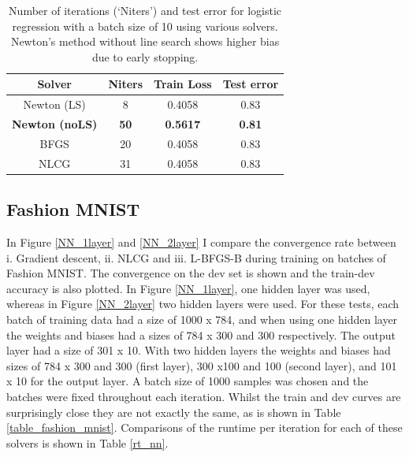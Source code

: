 \documentclass[11pt,twocolumn]{article}
\begin{document}
\begin{table}[h!]
\begin{center}
\begin{tabular}{ cccc} %
\hline
Solver & Niters & Train Loss & Test error  \\ 
\hline 
\hline
Newton (LS) & 8 & 0.4058 & 0.83\\ 
\textbf{Newton (noLS)} & \textbf{50} & \textbf{0.5617} & \textbf{0.81}\\ 
BFGS & 20 & 0.4058 & 0.83\\ 
NLCG & 31 & 0.4058 & 0.83\\ 
\end{tabular}
\end{center}
\caption{Number of iterations (`Niters')  and test error for logistic regression with a batch size of 10 using various solvers. Newton's method without line search shows higher bias due to early stopping.}\label{table_sfixlogreg_testerror}
\end{table}

\subsection{Fashion MNIST} \label{results_NN}
In Figure \ref{NN_1layer} and \ref{NN_2layer} I compare the convergence rate between i. Gradient descent,  ii. NLCG and  iii. L-BFGS-B during training on batches of Fashion MNIST. The convergence on the dev set is shown and the train-dev accuracy is also plotted. In Figure \ref{NN_1layer}, one hidden layer was used, whereas in Figure \ref{NN_2layer} two hidden layers were used. For these tests, each batch of training data had a size of 1000 x 784, and when using one hidden layer the weights and biases had a sizes of 784 x 300 and 300 respectively. The output layer had a size of 301 x 10. With two hidden layers the weights and biases had sizes of 784 x 300 and 300 (first layer), 300 x100 and 100 (second layer), and 101 x 10 for the output layer. A batch size of 1000 samples was chosen and the batches were fixed throughout each iteration. Whilst the train and dev curves are surprisingly close they are not exactly the same, as is shown in Table \ref{table_fashion_mnist}. Comparisons of the runtime per iteration for each of these solvers is shown in Table \ref{rt_nn}.
\end{document}
